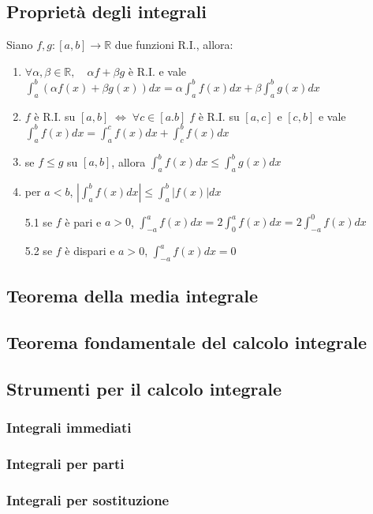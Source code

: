 \documentclass[a4paper]{article}
\begin{document}
\subsection{Proprietà degli integrali}
Siano \(f, g: \left[a, b\right] \to \mathbb{R}\) due funzioni R.I., allora:
\begin{enumerate}
	\item \(\forall \alpha, \beta \in \mathbb{R}, \quad \alpha f + \beta g\) è R.I. e vale \(\displaystyle \int_{a}^{b} \left(\alpha f(x) + \beta g(x)\right) dx = \alpha \int_{a}^{b} f(x) dx + \beta \int_{a}^{b} g(x) dx\)
	\item \(f\) è R.I. su \(\left[a, b\right] \; \Leftrightarrow \; \forall c \in \left[a. b\right] \; f\) è R.I. su \(\left[a, c\right]\) e \(\left[c, b\right]\) e vale 
	\(\displaystyle \int_{a}^{b} f(x) dx = \int_{a}^{c} f(x) dx + \int_{c}^{b} f(x) dx\)
	\item se \(f \leq g\) su \(\left[a, b\right]\), allora \(\displaystyle \int_{a}^{b} f(x) dx \leq \int_{a}^{b} g(x) dx\)
	\item per \(a < b\), \(\displaystyle \left| \int_{a}^{b} f(x) dx\right| \leq \int_{a}^{b} \left|f(x)\right| dx\)
	\item[5.1] se \(f\) è pari e \(a > 0\), \(\int_{-a}^{a} f(x) dx = 2 \int_{0}^{a} f(x) dx = 2 \int_{-a}^{0} f(x) dx\)
	\item[5.2] se \(f\) è dispari e \(a > 0\), \(\int_{-a}^{a} f(x) dx = 0\)
\end{enumerate}

\subsection{Teorema della media integrale}
\subsection{Teorema fondamentale del calcolo integrale}
\subsection{Strumenti per il calcolo integrale}
\subsubsection*{Integrali immediati}
\subsubsection*{Integrali per parti}
\subsubsection*{Integrali per sostituzione}
\end{document}
